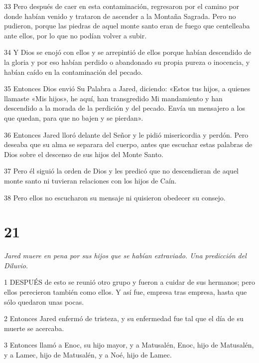 \par 33 Pero después de caer en esta contaminación, regresaron por el camino por donde habían venido y trataron de ascender a la Montaña Sagrada. Pero no pudieron, porque las piedras de aquel monte santo eran de fuego que centelleaba ante ellos, por lo que no podían volver a subir.

\par 34 Y Dios se enojó con ellos y se arrepintió de ellos porque habían descendido de la gloria y por eso habían perdido o abandonado su propia pureza o inocencia, y habían caído en la contaminación del pecado.

\par 35 Entonces Dios envió Su Palabra a Jared, diciendo: «Estos tus hijos, a quienes llamaste «Mis hijos», he aquí, han transgredido Mi mandamiento y han descendido a la morada de la perdición y del pecado. Envía un mensajero a los que quedan, para que no bajen y se pierdan».

\par 36 Entonces Jared lloró delante del Señor y le pidió misericordia y perdón. Pero deseaba que su alma se separara del cuerpo, antes que escuchar estas palabras de Dios sobre el descenso de sus hijos del Monte Santo.

\par 37 Pero él siguió la orden de Dios y les predicó que no descendieran de aquel monte santo ni tuvieran relaciones con los hijos de Caín.

\par 38 Pero ellos no escucharon su mensaje ni quisieron obedecer su consejo.

\chapter{21}

\par \textit{Jared muere en pena por sus hijos que se habían extraviado. Una predicción del Diluvio.}

\par 1 DESPUÉS de esto se reunió otro grupo y fueron a cuidar de sus hermanos; pero ellos perecieron también como ellos. Y así fue, empresa tras empresa, hasta que sólo quedaron unas pocas.

\par 2 Entonces Jared enfermó de tristeza, y su enfermedad fue tal que el día de su muerte se acercaba.

\par 3 Entonces llamó a Enoc, su hijo mayor, y a Matusalén, Enoc, hijo de Matusalén, y a Lamec, hijo de Matusalén, y a Noé, hijo de Lamec.

